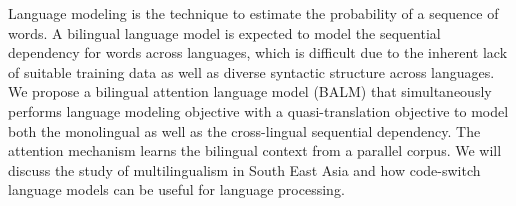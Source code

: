 Language modeling is the technique to estimate the probability of a sequence of words. A bilingual language model is expected to model the sequential dependency for words across languages, which is difficult due to the inherent lack of suitable training data as well as diverse syntactic structure across languages. We propose a bilingual attention language model (BALM) that simultaneously performs language modeling objective with a quasi-translation objective to model both the monolingual as well as the cross-lingual sequential dependency. The attention mechanism learns the bilingual context from a parallel corpus. We will discuss the study of multilingualism in South East Asia and how code-switch language models can be useful for language processing. 